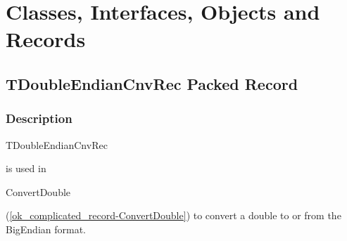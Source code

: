 \documentclass{report}
\newif\ifpdf
\begin{document}
\section{Classes, Interfaces, Objects and Records}
\ifpdf
\subsection*{\large{\textbf{TDoubleEndianCnvRec Packed Record}}\normalsize\hspace{1ex}\hrulefill}
\else
\subsection*{TDoubleEndianCnvRec Packed Record}
\fi
\label{ok_complicated_record.TDoubleEndianCnvRec}
\subsubsection*{\large{\textbf{Description}}\normalsize\hspace{1ex}\hfill}
\begin{ttfamily}TDoubleEndianCnvRec\end{ttfamily} is used in \begin{ttfamily}ConvertDouble\end{ttfamily}(\ref{ok_complicated_record-ConvertDouble}) to convert a double to or from the BigEndian format.\hfill\vspace*{1ex}
\end{document}
